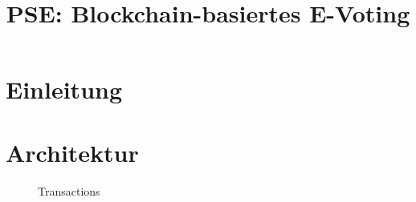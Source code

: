 \documentclass[parskip=full]{scrartcl}
\title{PSE: Blockchain-basiertes E-Voting}
\begin{document}
	\clearpage
	\maketitle
	\newpage
	
	\tableofcontents
	\newpage
	\section{Einleitung}
	
	\section{Architektur}
	\begin{figure}[!h]
	\centering
	
	\caption{Transactions}
	\end{figure}
\end{document}
